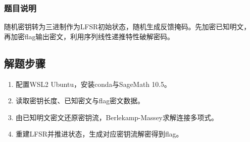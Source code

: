 \documentclass[12pt,a4paper,UTF8]{ctexart}
\begin{document}
\subsubsection{题目说明}
随机密钥转为三进制作为LFSR初始状态，随机生成反馈掩码。先加密已知明文，再加密flag输出密文，利用序列线性递推特性破解密码。

\subsection{解题步骤}
\begin{enumerate}[itemsep=3pt, parsep=0pt]
    \item 配置WSL2 Ubuntu，安装conda与SageMath 10.5。
    \item 读取密钥长度、已知密文与flag密文数据。
    \item 由已知明文密文还原密钥流，Berlekamp-Massey求解连接多项式。
    \item 重建LFSR并推进状态，生成对应密钥流解密得到flag。
\end{enumerate}
\end{document}
